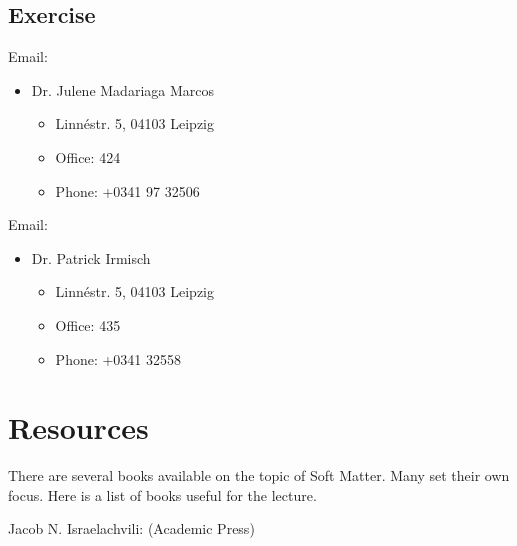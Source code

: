 \documentclass[letterpaper,10pt,english]{sphinxmanual}
\begin{document}
\section{Exercise}
\label{\detokenize{course-info/instructors:exercise}}
\sphinxAtStartPar
Email: 
\begin{itemize}
\item {} 
\sphinxAtStartPar
Dr. Julene Madariaga Marcos
\begin{itemize}
\item {} 
\sphinxAtStartPar
Linnéstr. 5, 04103 Leipzig

\item {} 
\sphinxAtStartPar
Office: 424

\item {} 
\sphinxAtStartPar
Phone: +0341 97 32506

\end{itemize}

\end{itemize}

\sphinxAtStartPar
Email: 
\begin{itemize}
\item {} 
\sphinxAtStartPar
Dr. Patrick Irmisch
\begin{itemize}
\item {} 
\sphinxAtStartPar
Linnéstr. 5, 04103 Leipzig

\item {} 
\sphinxAtStartPar
Office: 435

\item {} 
\sphinxAtStartPar
Phone: +0341 32558

\end{itemize}

\end{itemize}


\chapter{Resources}
\label{\detokenize{course-info/resources:resources}}\label{\detokenize{course-info/resources::doc}}
\sphinxAtStartPar
There are several books available on the topic of Soft Matter. Many set their own focus. Here is a list of books useful for the lecture.

\sphinxAtStartPar
Jacob N. Israelachvili:  (Academic Press)
\end{document}
